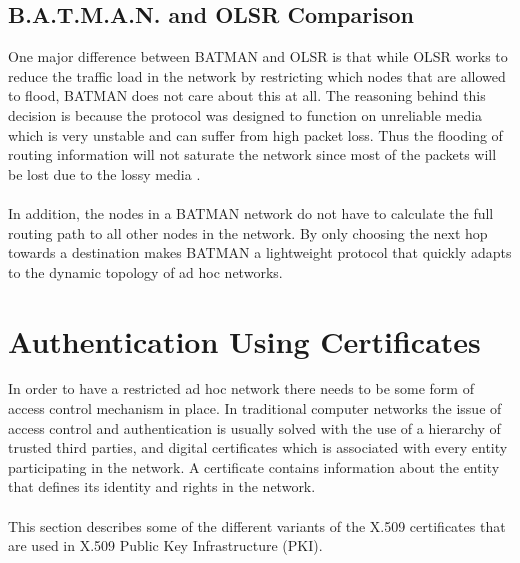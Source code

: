 \subsection{B.A.T.M.A.N. and OLSR Comparison}\label{batman_olsr_comparison}
One major difference between BATMAN and OLSR is that while OLSR works to reduce the traffic load in the network by restricting which nodes that are allowed to flood, BATMAN does not care about this at all. The reasoning behind this decision is because the protocol was designed to function on unreliable media which is very unstable and can suffer from high packet loss. Thus the flooding of routing information will not saturate the network since most of the packets will be lost due to the lossy media \cite{batman_rfc}.
\\\\
In addition, the nodes in a BATMAN network do not have to calculate the full routing path to all other nodes in the network. By only choosing the next hop towards a destination makes BATMAN a lightweight protocol that quickly adapts to the dynamic topology of ad hoc networks.

\section{Authentication Using Certificates}\label{authentication} %
In order to have a restricted ad hoc network there needs to be some form of access control mechanism in place. In traditional computer networks the issue of access control and authentication is usually solved with the use of a hierarchy of trusted third parties, and digital certificates which is associated with every entity participating in the network. A certificate contains information about the entity that defines its identity and rights in the network.
\\\\
This section describes some of the different variants of the X.509 certificates that are used in X.509 Public Key Infrastructure (PKI). 

